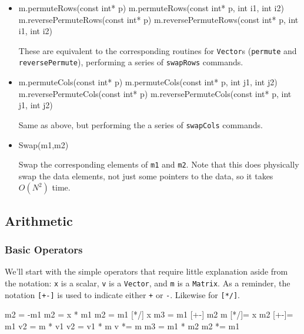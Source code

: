 \documentclass[twoside,letterpaper,11pt]{article}
\renewcommand{\tt}[1]{{\lstinline {#1}}}
\begin{document}
\begin{itemize}
\item
\begin{tmvcode}
m.permuteRows(const int* p)
m.permuteRows(const int* p, int i1, int i2)
m.reversePermuteRows(const int* p)
m.reversePermuteRows(const int* p, int i1, int i2)
\end{tmvcode}
These are equivalent to the corresponding routines for \tt{Vector}s 
(\tt{permute} and \tt{reversePermute}), performing a series of \tt{swapRows} commands.

\item
\begin{tmvcode}
m.permuteCols(const int* p)
m.permuteCols(const int* p, int j1, int j2)
m.reversePermuteCols(const int* p)
m.reversePermuteCols(const int* p, int j1, int j2)
\end{tmvcode}
Same as above, but performing the a series of \tt{swapCols} commands.

\item
\begin{tmvcode}
Swap(m1,m2)
\end{tmvcode}
Swap the corresponding elements of \tt{m1} and \tt{m2}.  Note that this does physically
swap the data elements, not just some pointers to the data, so it takes $O(N^2)$ time.

\end{itemize}

\subsection{Arithmetic}

\subsubsection{Basic Operators}

We'll start with the simple operators that require little explanation aside from the 
notation: 
\tt{x} is a scalar, \tt{v} is a \tt{Vector}, and \tt{m} is a \tt{Matrix}.  As a reminder,
the notation \tt{[+-]} is used to indicate either \tt{+} or \tt{-}.  Likewise for \tt{[*/]}.
\begin{tmvcode}
m2 = -m1
m2 = x * m1
m2 = m1 [*/] x
m3 = m1 [+-] m2
m [*/]= x
m2 [+-]= m1
v2 = m * v1
v2 = v1 * m
v *= m
m3 = m1 * m2
m2 *= m1
\end{tmvcode}
\end{document}
